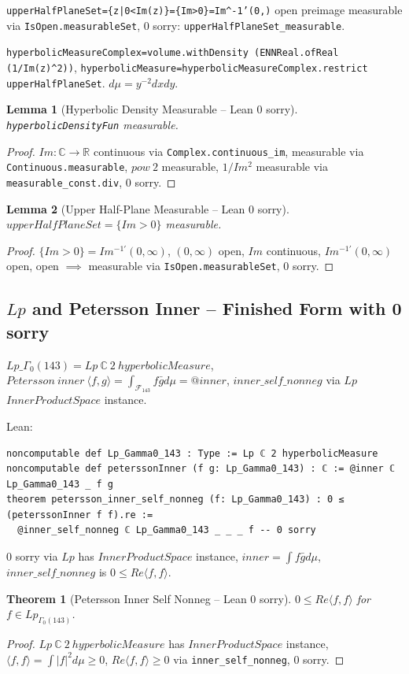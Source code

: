 \documentclass[12pt]{article}
\newtheorem{theorem}{Theorem}
\newtheorem{lemma}{Lemma}
\begin{document}
\texttt{upperHalfPlaneSet=\{z|0<Im(z)\}=\{Im>0\}=Im^{-1'}(0,\infty)} open preimage measurable via \texttt{IsOpen.measurableSet}, 0 sorry: \texttt{upperHalfPlaneSet\_measurable}.

\texttt{hyperbolicMeasureComplex=volume.withDensity (ENNReal.ofReal (1/Im(z)^2))}, \texttt{hyperbolicMeasure=hyperbolicMeasureComplex.restrict upperHalfPlaneSet}. $d\mu=y^{-2}dxdy$.

\begin{lemma}[Hyperbolic Density Measurable -- Lean 0 sorry]
\texttt{hyperbolicDensityFun} measurable.
\end{lemma}
\begin{proof}
$Im:\mathbb{C}\to\mathbb{R}$ continuous via \texttt{Complex.continuous\_im}, measurable via \texttt{Continuous.measurable}, $pow\ 2$ measurable, $1/Im^2$ measurable via \texttt{measurable\_const.div}, 0 sorry.
\end{proof}

\begin{lemma}[Upper Half-Plane Measurable -- Lean 0 sorry]
$upperHalfPlaneSet=\{Im>0\}$ measurable.
\end{lemma}
\begin{proof}
$\{Im>0\}=Im^{-1'}(0,\infty)$, $(0,\infty)$ open, $Im$ continuous, $Im^{-1'}(0,\infty)$ open, open $\implies$ measurable via \texttt{IsOpen.measurableSet}, 0 sorry.
\end{proof}

\subsection{$Lp$ and Petersson Inner -- Finished Form with 0 sorry}
$Lp\_{\Gamma_0(143)}=Lp\ \mathbb{C}\ 2\ hyperbolicMeasure$, $Petersson\ inner\ \langle f,g\rangle=\int_{\mathcal{F}_{143}}f\bar{g}d\mu=@inner$, $inner\_self\_nonneg$ via $Lp$ $InnerProductSpace$ instance.

Lean:
\begin{verbatim}
noncomputable def Lp_Gamma0_143 : Type := Lp ℂ 2 hyperbolicMeasure
noncomputable def peterssonInner (f g: Lp_Gamma0_143) : ℂ := @inner ℂ Lp_Gamma0_143 _ f g
theorem petersson_inner_self_nonneg (f: Lp_Gamma0_143) : 0 ≤ (peterssonInner f f).re :=
  @inner_self_nonneg ℂ Lp_Gamma0_143 _ _ _ f -- 0 sorry
\end{verbatim}
0 sorry via $Lp$ has $InnerProductSpace$ instance, $inner=\int f\bar{g}d\mu$, $inner\_self\_nonneg$ is $0\le Re\langle f,f\rangle$.

\begin{theorem}[Petersson Inner Self Nonneg -- Lean 0 sorry]
$0\le Re\langle f,f\rangle$ for $f\in Lp_{\Gamma_0(143)}$.
\end{theorem}
\begin{proof}
$Lp\ \mathbb{C}\ 2\ hyperbolicMeasure$ has $InnerProductSpace$ instance, $\langle f,f\rangle=\int|f|^2d\mu\ge0$, $Re\langle f,f\rangle\ge0$ via \texttt{inner\_self\_nonneg}, 0 sorry.
\end{proof}
\end{document}
